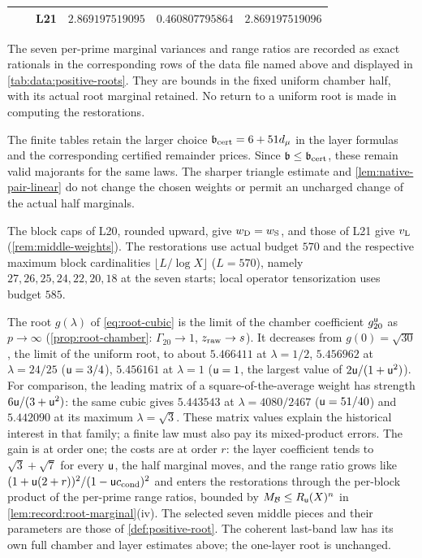 \begin{certificate}
\begin{center}
\begin{tabular}{@{}llllll@{}}
 &  & L21 & $2.869197519095$ & $0.460807795864$ & $2.869197519096$\\
\bottomrule
\end{tabular}
\end{center}
The seven per-prime marginal variances and range ratios are recorded as
exact rationals in the corresponding rows of the data file named above and
displayed in
\cref{tab:data:positive-roots}. They are bounds in the fixed uniform
chamber half, with its actual root marginal retained. No return to a
uniform root is made in computing the restorations.
\end{certificate}

The finite tables retain the larger choice
$\mathfrak b_{\rm cert}=6+51d_\mu$ in the layer formulas and the
corresponding certified remainder prices. Since
$\mathfrak b\le\mathfrak b_{\rm cert}$, these remain valid
majorants for the same laws. The sharper triangle estimate and
\cref{lem:native-pair-linear} do not change the chosen weights or
permit an uncharged change of the actual half marginals.

The block caps of L20, rounded upward, give $w_{\rm D}=w_{\rm S}$,
and those of L21 give $v_{\rm L}$ (\cref{rem:middle-weights}). The
restorations use actual budget $570$ and the respective maximum block
cardinalities $\lfloor L/\log X\rfloor$ ($L=570$), namely
$27,26,25,24,22,20,18$ at the seven starts; local operator tensorization
uses budget $585$.

\begin{remark}\label{rem:positive-root-family}
The root $g(\lambda)$ of \eqref{eq:root-cubic} is the limit of the chamber coefficient
$g^\mathsf u_{20}$ as $p\to\infty$ (\cref{prop:root-chamber}: $\Gamma_{20}\to1$, $z_{\rm raw}\to s$).
It decreases from $g(0)=\sqrt{30}$, the limit of the uniform root, to about $5.466411$ at
$\lambda=1/2$, $5.456962$ at $\lambda=24/25$ ($\mathsf u=3/4$), $5.456161$ at $\lambda=1$ ($\mathsf u=1$,
the largest value of $2\mathsf u/(1+\mathsf u^2)$).
For comparison, the leading matrix of a square-of-the-average weight
has strength $6\mathsf u/(3+\mathsf u^2)$: the same cubic gives $5.443543$ at
$\lambda=4080/2467$ ($\mathsf u=51/40$) and $5.442090$ at its maximum
$\lambda=\sqrt3$. These matrix values explain the historical interest in
that family; a finite law must also pay its mixed-product errors. The gain is at order one; the costs are at order $r$: the layer coefficient
tends to $\sqrt3+\sqrt7$ for every $\mathsf u$, the half marginal moves, and the range ratio
grows like $(1+\mathsf u(2+r))^2/(1-\mathsf u c_{\rm cond})^2$ and enters the restorations through the
per-block product of the per-prime range ratios, bounded by
$M_{\mathcal B}\le R_\mathsf u(X)^n$ in \cref{lem:record:root-marginal}(iv). The selected seven middle pieces and their parameters are those of
\cref{def:positive-root}. The coherent last-band law has its own full
chamber and layer estimates above; the one-layer root is unchanged.
\end{remark}

